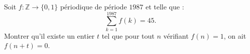 Soit $f : \mathbb{Z} \to \{0, 1\}$ périodique de période $1987$ et telle que :
\[
\sum_{k=1}^{1987} f(k) = 45.
\]
Montrer qu'il existe un entier $t$ tel que pour tout $n$ vérifiant $f(n) = 1$, on ait $f(n + t) = 0$.
